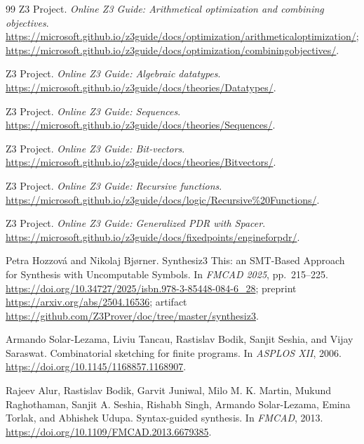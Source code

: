 \documentclass[11pt,oneside]{report}
\begin{document}
\begin{thebibliography}{99}
Z3 Project.
\newblock \emph{Online Z3 Guide: Arithmetical optimization and combining objectives}.
\newblock \url{https://microsoft.github.io/z3guide/docs/optimization/arithmeticaloptimization/};
\url{https://microsoft.github.io/z3guide/docs/optimization/combiningobjectives/}.

Z3 Project.
\newblock \emph{Online Z3 Guide: Algebraic datatypes}.
\newblock \url{https://microsoft.github.io/z3guide/docs/theories/Datatypes/}.

Z3 Project.
\newblock \emph{Online Z3 Guide: Sequences}.
\newblock \url{https://microsoft.github.io/z3guide/docs/theories/Sequences/}.

Z3 Project.
\newblock \emph{Online Z3 Guide: Bit-vectors}.
\newblock \url{https://microsoft.github.io/z3guide/docs/theories/Bitvectors/}.

Z3 Project.
\newblock \emph{Online Z3 Guide: Recursive functions}.
\newblock \url{https://microsoft.github.io/z3guide/docs/logic/Recursive%20Functions/}.

Z3 Project.
\newblock \emph{Online Z3 Guide: Generalized PDR with Spacer}.
\newblock \url{https://microsoft.github.io/z3guide/docs/fixedpoints/engineforpdr/}.

Petra Hozzov\'a and Nikolaj Bj\o rner.
\newblock Synthesiz3 This: an SMT-Based Approach for Synthesis with Uncomputable Symbols.
\newblock In \emph{FMCAD 2025}, pp.~215--225. \url{https://doi.org/10.34727/2025/isbn.978-3-85448-084-6_28}; preprint \url{https://arxiv.org/abs/2504.16536}; artifact \url{https://github.com/Z3Prover/doc/tree/master/synthesiz3}.

Armando Solar-Lezama, Liviu Tancau, Rastislav Bodik, Sanjit Seshia, and Vijay Saraswat.
\newblock Combinatorial sketching for finite programs.
\newblock In \emph{ASPLOS XII}, 2006.
\newblock \url{https://doi.org/10.1145/1168857.1168907}.

Rajeev Alur, Rastislav Bodik, Garvit Juniwal, Milo M. K. Martin, Mukund Raghothaman, Sanjit A. Seshia, Rishabh Singh, Armando Solar-Lezama, Emina Torlak, and Abhishek Udupa.
\newblock Syntax-guided synthesis.
\newblock In \emph{FMCAD}, 2013.
\newblock \url{https://doi.org/10.1109/FMCAD.2013.6679385}.

\end{thebibliography}
\end{document}
